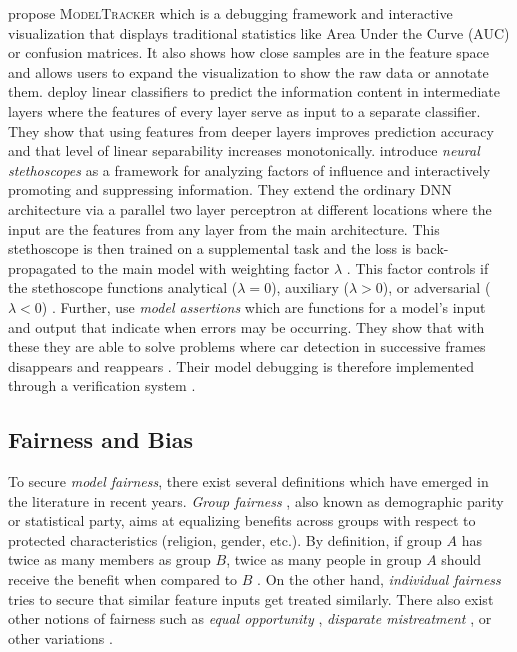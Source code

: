 \citet{amershi2015modeltracker} propose \textsc{ModelTracker} which is a debugging framework and interactive visualization that displays traditional statistics like Area Under the Curve (AUC) or confusion matrices. It also shows how close samples are in the feature space and allows users to expand the visualization to show the raw data or annotate them. \citet{AlainB17} deploy linear classifiers to predict the information content in intermediate layers where the features of every layer serve as input to a separate classifier. They show that using features from deeper layers improves prediction accuracy and  that level of linear separability increases monotonically. \citet{fuchs2018scrutinizing} introduce \emph{neural stethoscopes} as a framework for analyzing factors of influence and interactively promoting and suppressing information. They extend the ordinary DNN architecture via a parallel two layer perceptron at different locations where the input are the features from any layer from the main architecture. This stethoscope is then trained on a supplemental task and the loss is back-propagated to the main model with weighting factor $\lambda$ \citep{fuchs2018scrutinizing}. This factor controls if the stethoscope functions analytical ($\lambda = 0$), auxiliary ($\lambda > 0$), or adversarial ($\lambda < 0$) \citep{fuchs2018scrutinizing}. Further, \citet{KangRBZ20} use \emph{model assertions} which are functions for a model's input and output that indicate when errors may be occurring. They show that with these they are able to solve problems where car detection in successive frames disappears and reappears \citep{KangRBZ20}. Their model debugging is therefore implemented through a verification system \citep{xie2020explainable}. 




\subsection{Fairness and Bias}
To secure \emph{model fairness}, there exist several definitions which have emerged in the literature in recent years. \emph{Group fairness} \citep{CaldersKP09}, also known as  demographic parity or statistical party, aims at equalizing benefits across groups with respect to protected characteristics (\eg religion, gender, etc.). By definition, if group $A$ has twice as many members as group $B$, twice as many people in group $A$ should receive the benefit when compared to $B$ \citep{xie2020explainable}. On the other hand, \emph{individual fairness} \citep{DworkHPRZ12} tries to secure that similar feature inputs get treated similarly. There also exist other notions of fairness such as \emph{equal opportunity} \citep{HardtPNS16}, \emph{disparate mistreatment} \citep{ZafarVGG17}, or other variations \citep{HeidariFGK18, WoodworthGOS17}.

